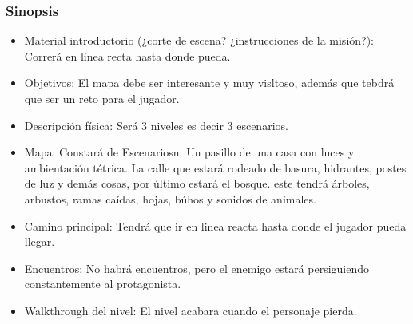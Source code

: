 \subsubsection{Sinopsis}
\begin{itemize}
	\item Material introductorio (¿corte de escena? ¿instrucciones de la misión?):
	      Correrá en linea recta hasta donde pueda.
	\item Objetivos:
	      El mapa debe ser interesante y muy visltoso, además que tebdrá que ser un reto
	      para el jugador.
	\item Descripción física:
	      Será 3 niveles es decir 3 escenarios.
	\item Mapa:
	      Constará de Escenariosn: Un pasillo de una casa con luces y ambientación tétrica.
	      La calle que estará rodeado de basura, hidrantes, postes de luz y demás cosas, por
	      último estará el bosque. este tendrá árboles, arbustos, ramas caídas, hojas, búhos y
	      sonidos de animales.
	\item Camino principal:
	      Tendrá que ir en linea reacta hasta donde el jugador pueda llegar.
	\item Encuentros:
	      No habrá encuentros, pero el enemigo estará persiguiendo constantemente al protagonista.
	\item Walkthrough del nivel:
	      El nivel acabara cuando el personaje pierda.

\end{itemize}
